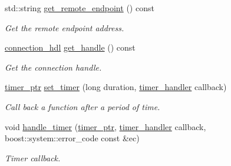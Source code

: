 \begin{DoxyCompactItemize}
\item 
std\+::string \hyperlink{classwebsocketpp_1_1transport_1_1asio_1_1connection_ac16d6ae60ee14176130dc92d12a30b61}{get\+\_\+remote\+\_\+endpoint} () const
\begin{DoxyCompactList}\small\item\em Get the remote endpoint address. \end{DoxyCompactList}\item 
\hyperlink{namespacewebsocketpp_a6b3d26a10ee7229b84b776786332631d}{connection\+\_\+hdl} \hyperlink{classwebsocketpp_1_1transport_1_1asio_1_1connection_af9931e0ac551bc307ca7d16061484998}{get\+\_\+handle} () const\hypertarget{classwebsocketpp_1_1transport_1_1asio_1_1connection_af9931e0ac551bc307ca7d16061484998}{}\label{classwebsocketpp_1_1transport_1_1asio_1_1connection_af9931e0ac551bc307ca7d16061484998}

\begin{DoxyCompactList}\small\item\em Get the connection handle. \end{DoxyCompactList}\item 
\hyperlink{classwebsocketpp_1_1transport_1_1asio_1_1connection_aa725ead0a0f3733f7f7e57076f194081}{timer\+\_\+ptr} \hyperlink{classwebsocketpp_1_1transport_1_1asio_1_1connection_ab9db04550ee6b3dd2643cd7d23cda3f1}{set\+\_\+timer} (long duration, \hyperlink{namespacewebsocketpp_1_1transport_a946cc56ff41139f3002149c15fd87bc9}{timer\+\_\+handler} callback)
\begin{DoxyCompactList}\small\item\em Call back a function after a period of time. \end{DoxyCompactList}\item 
void \hyperlink{classwebsocketpp_1_1transport_1_1asio_1_1connection_a72742278fc366815d31e110f973f4cdf}{handle\+\_\+timer} (\hyperlink{classwebsocketpp_1_1transport_1_1asio_1_1connection_aa725ead0a0f3733f7f7e57076f194081}{timer\+\_\+ptr}, \hyperlink{namespacewebsocketpp_1_1transport_a946cc56ff41139f3002149c15fd87bc9}{timer\+\_\+handler} callback, boost\+::system\+::error\+\_\+code const \&ec)
\begin{DoxyCompactList}\small\item\em Timer callback. \end{DoxyCompactList}\end{DoxyCompactItemize}
